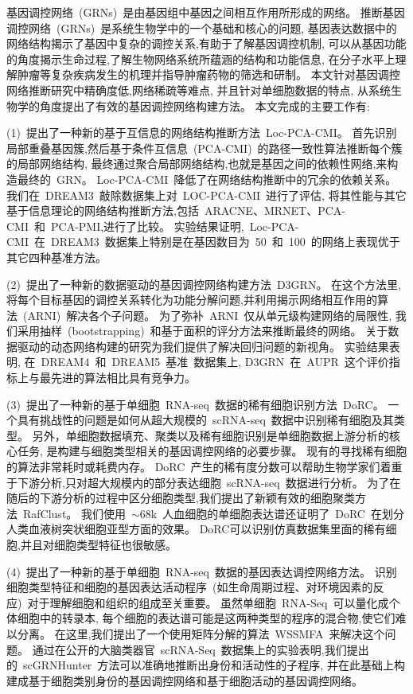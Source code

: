 \begin{abstractcn}
基因调控网络~(GRNs)~是由基因组中基因之间相互作用所形成的网络。
推断基因调控网络~(GRNs)~是系统生物学中的一个基础和核心的问题,
基因表达数据中的网络结构揭示了基因中复杂的调控关系,有助于了解基因调控机制,
可以从基因功能的角度揭示生命过程,了解生物网络系统所蕴涵的结构和功能信息,
在分子水平上理解肿瘤等复杂疾病发生的机理并指导肿瘤药物的筛选和研制。
本文针对基因调控网络推断研究中精确度低,网络稀疏等难点,
并且针对单细胞数据的特点, 从系统生物学的角度提出了有效的基因调控网络构建方法。
本文完成的主要工作有:

(1)~提出了一种新的基于互信息的网络结构推断方法~Loc-PCA-CMI。
首先识别局部重叠基因簇,然后基于条件互信息~(PCA-CMI)~的路径一致性算法推断每个簇的局部网络结构,
最终通过聚合局部网络结构,也就是基因之间的依赖性网络,来构造最终的~GRN。
Loc-PCA-CMI~降低了在网络结构推断中的冗余的依赖关系。
我们在~DREAM3~敲除数据集上对~LOC-PCA-CMI~进行了评估,
将其性能与其它基于信息理论的网络结构推断方法,包括~ARACNE、MRNET、PCA-CMI~和~PCA-PMI,进行了比较。
实验结果证明,~Loc-PCA-CMI~在~DREAM3~数据集上特别是在基因数目为~50~和~100~的网络上表现优于其它四种基准方法。

(2)~提出了一种新的数据驱动的基因调控网络构建方法~D3GRN。
在这个方法里,将每个目标基因的调控关系转化为功能分解问题,并利用揭示网络相互作用的算法~(ARNI)~解决各个子问题。
为了弥补~ARNI~仅从单元级构建网络的局限性,
我们采用抽样~(bootstrapping)~和基于面积的评分方法来推断最终的网络。
关于数据驱动的动态网络构建的研究为我们提供了解决回归问题的新视角。
实验结果表明, 在~DREAM4~和~DREAM5~基准~数据集上, D3GRN~在~AUPR~这个评价指标上与最先进的算法相比具有竞争力。

(3)~提出了一种新的基于单细胞~RNA-seq~数据的稀有细胞识别方法~DoRC。
一个具有挑战性的问题是如何从超大规模的~scRNA-seq~数据中识别稀有细胞及其类型。
另外，单细胞数据填充、聚类以及稀有细胞识别是单细胞数据上游分析的核心任务, 是构建与细胞类型相关的基因调控网络的必要步骤。
现有的寻找稀有细胞的算法非常耗时或耗费内存。
DoRC~产生的稀有度分数可以帮助生物学家们着重于下游分析,只对超大规模内的部分表达细胞~scRNA-seq~数据进行分析。
为了在随后的下游分析的过程中区分细胞类型,我们提出了新颖有效的细胞聚类方法~RafClust。
我们使用~${\sim}68$k~人血细胞的单细胞表达谱还证明了~DoRC~在划分人类血液树突状细胞亚型方面的效果。
DoRC可以识别仿真数据集里面的稀有细胞,并且对细胞类型特征也很敏感。

(4)~提出了一种新的基于单细胞~RNA-seq~数据的基因表达调控网络方法。
识别细胞类型特征和细胞的基因表达活动程序~(如生命周期过程、对环境因素的反应)~对于理解细胞和组织的组成至关重要。
虽然单细胞~RNA-Seq~可以量化成个体细胞中的转录本,
每个细胞的表达谱可能是这两种类型的程序的混合物,使它们难以分离。
在这里,我们提出了一个使用矩阵分解的算法~WSSMFA~来解决这个问题。
通过在公开的大脑类器官~scRNA-Seq~数据集上的实验表明,我们提出的~scGRNHunter~方法可以准确地推断出身份和活动性的子程序, 
并在此基础上构建成基于细胞类别身份的基因调控网络和基于细胞活动的基因调控网络。


\end{abstractcn}